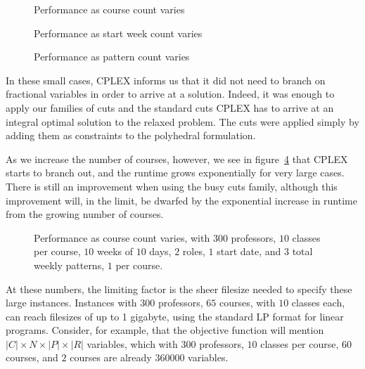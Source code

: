 \begin{figure}
\begin{center}
\caption{Performance as course count varies}
\label{bench:courses}
\end{center}
\end{figure}

\begin{figure}
\begin{center}
\caption{Performance as start week count varies}
\label{bench:startdates}
\end{center}
\end{figure}

\begin{figure}
\begin{center}
\caption{Performance as pattern count varies}
\label{bench:patterns}
\end{center}
\end{figure}

In these small cases, CPLEX informs us that it did not need to branch on fractional variables in order to arrive at a solution. Indeed, it was enough to apply our families of cuts and the standard cuts CPLEX has to arrive at an integral optimal solution to the relaxed problem. The cuts were applied simply by adding them as constraints to the polyhedral formulation.

As we increase the number of courses, however, we see in figure~\ref{bench:megacourses} that CPLEX starts to branch out, and the runtime grows exponentially for very large cases. There is still an improvement when using the busy cuts family, although this improvement will, in the limit, be dwarfed by the exponential increase in runtime from the growing number of courses.

\begin{figure}
  \begin{center}
    \caption{Performance as course count varies, with $300$ professors, $10$ classes per course, $10$ weeks of $10$ days, $2$ roles, $1$ start date, and $3$ total weekly patterns, $1$ per course.}
    \label{bench:megacourses}
  \end{center}
\end{figure}

At these numbers, the limiting factor is the sheer filesize needed to specify these large instances. Instances with $300$ professors, $65$ courses, with $10$ classes each, can reach filesizes of up to 1 gigabyte, using the standard LP format for linear programs. Consider, for example, that the objective function will mention $|C| \times N \times |P| \times |R|$ variables, which with $300$ professors, $10$ classes per course, $60$ courses, and $2$ courses are already $360000$ variables.

